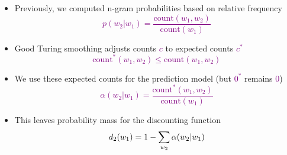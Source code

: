\documentclass[landscape]{slides}
\newcommand{\maths}[1]{\textcolor{purple}{#1}}
\begin{document}

\begin{itemize}
\item Previously, we computed n-gram probabilities based on relative frequency
\vspace{-3mm}
\maths{\begin{equation*}
p(w_2|w_1) = \frac{\text{count}(w_1,w_2)}{\text{count}(w_1)}
\end{equation*}}\vspace{-15mm}
\item Good Turing smoothing adjusts counts \maths{$c$} to expected counts \maths{$c^*$}
\vspace{-3mm}
\maths{\begin{equation*}
\text{count}^*(w_1,w_2) \leq \text{count}(w_1,w_2)
\end{equation*}}\vspace{-15mm}
\item We use these expected counts for the prediction model (but \maths{$0^*$} remains \maths{$0$})
\vspace{-3mm}
\maths{\begin{equation*}
\alpha(w_2|w_1) = \frac{\text{count}^*(w_1,w_2)}{\text{count}(w_1)}
\end{equation*}}\vspace{-15mm}
\item This leaves probability mass for the discounting function
\vspace{-3mm}
\maths{\begin{equation*}
d_2(w_1) = 1 - \sum_{w_2} \alpha(w_2|w_1)\vspace{-20mm}
\end{equation*}}
\end{itemize}

\end{document}
